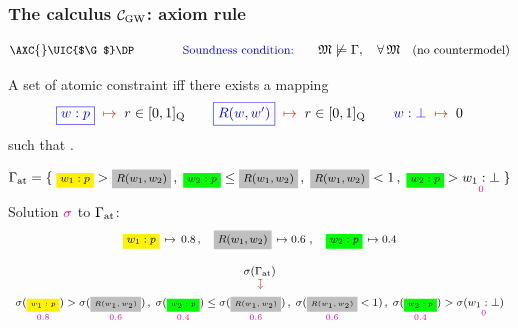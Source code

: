 \begin{frame}
  \frametitle{The calculus $\mathcal{C}_{\mathrm{GW}}$: axiom rule}\small



  \[\small
    \AXC{}
    \RightLabel{\small$\ruleAxat$}
    \UIC{$\G$}    
    \DP  %
\hspace{4em} \text{\tb{Soundness condition:}}\qquad \M\not\models \G,\quad \forall\,\M
\quad\text{(no countermodel)}
\]

\MP
  \begin{tcgreenbox}[top=0ex]{}
    A set of atomic constraint  iff there exists
     a   mapping
    \[
      {\color{blue} \fbox{$w:p$}}\;\;{\color{red} \mapsto}\;\; r\in[0,1]_{\mathrm{Q}}
      \qquad
      {\color{blue} \fbox{$R(w,w')$}}\;\;{\color{red} \mapsto}\;\; r\in[0,1]_{\mathrm{Q}}
      \qquad
      {\color{blue} w:\bot}\;\;{\color{red} \mapsto}\;\; 0
    \]
    such that .
  \end{tcgreenbox}

  \SSK

\small%
\[\medfont
    \Gat= \{\;\ycbox{$w_1 : p$} > \gcbox{$R(w_1,w_2)$}\,,\; \ggbox{$w_2 : p$} \leq \gcbox{$R(w_1,w_2)$}\,,\;
    \gcbox{$R(w_1,w_2)$} < 1\,,\;  \ggbox{$w_2 : p$} > \underset{\tm 0}{w_1 :\bot}   \;\}
  \]
Solution ${\color{magenta} \sigma}$ to $\Gamma_\mathrm{at}$:
    \[\medfont
      \begin{array}{c}
      \ycbox{$w_1:p$}\,\mapsto\, 0.8\,,\quad
    \gcbox{$R(w_1,w_2)$}\,\mapsto 0.6\,\,,\quad
    \ggbox{$w_2:p$}\,\mapsto 0.4
\\[4ex]
\scriptsize
        \s(\Gat) 
\\[-2ex]
\rotatebox{-90}{$\tr{\mapsto}$} 
\\[3ex]
        \tiny
        \s(\underset{\tm{0.8}}{\ycbox{$w_1 : p$}}) > \s(\underset{\tm{0.6}}{\gcbox{$R(w_1,w_2)$}})\,,\;
      \s(\underset{\tm{0.4}}{\ggbox{$w_2 : p$}}) \leq \s(\underset{\tm{0.6}}{\gcbox{$R(w_1,w_2)$}})\,,\;
       \s( \underset{\tm{0.6}}{\gcbox{$R(w_1,w_2)$}} < 1)\,,\;
       \s( \underset{\tm{0.4}}{\ggbox{$w_2 : p$}}) > \s(\underset{\tm 0}{w_1 :\bot})   
\end{array}
        \]

    


  \VFILL
\end{frame}




